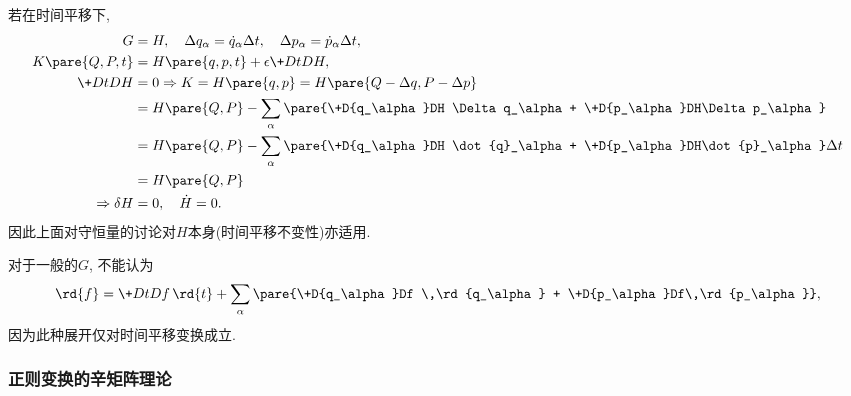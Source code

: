 \documentclass[../LectureNotes.tex]{subfiles}
\begin{document}
若在时间平移下,
\begin{align*}
    G &= H,\quad \Delta q_\alpha = \dot{q}_\alpha\Delta t,\quad \Delta p_\alpha = \dot{p}_\alpha \Delta t, \\
    K\pare{Q,P,t} &= H\pare{q,p,t} + \epsilon \+DtDH,\\
    \+DtDH &= 0 \Rightarrow K = H\pare{q,p} = H\pare{Q-\Delta q,P-\Delta p} \\
    &= H\pare{Q,P} - \sum_\alpha \pare{\+D{q_\alpha}DH \Delta q_\alpha + \+D{p_\alpha}DH\Delta p_\alpha} \\
    &= H\pare{Q,P} - \sum_\alpha \pare{\+D{q_\alpha}DH \dot{q}_\alpha + \+D{p_\alpha}DH\dot{p}_\alpha}\Delta t \\
    &= H\pare{Q,P} \\
    \Rightarrow \delta H &= 0,\quad \dot{H} = 0.
\end{align*}
因此上面对守恒量的讨论对$H$本身(时间平移不变性)亦适用.
\begin{remark}
    对于一般的$G$, 不能认为
    \[ \rd{f} = \+DtDf\,\rd{t} + \sum_\alpha\pare{\+D{q_\alpha}Df \,\rd{q_\alpha} + \+D{p_\alpha}Df\,\rd{p_\alpha}}, \]
    因为此种展开仅对时间平移变换成立.
\end{remark}


\subsubsection{正则变换的辛矩阵理论} %
\label{ssub:正则变换的辛矩阵理论}
\end{document}
